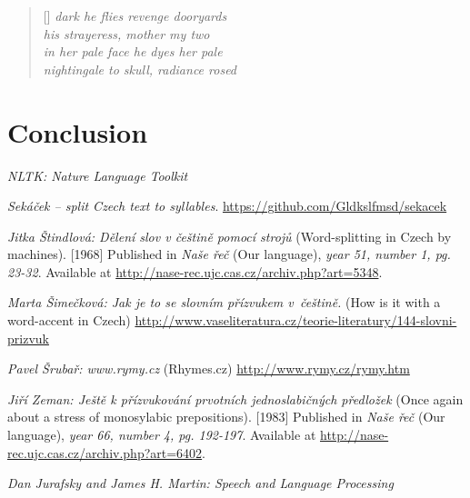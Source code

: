 \documentclass[a4]{article}
\begin{document}
\settowidth{\versewidth}{Than Tycho Brahe, or Erra Pater:}
\begin{verse}[\versewidth]
\it
dark he flies revenge dooryards \\
his strayeress, mother my two\\
in her pale face he dyes her pale\\
nightingale to skull, radiance rosed\\
\end{verse}



\section{Conclusion}


\begin{thebibliography}{99}

 {\sl NLTK: Nature Language Toolkit}

 {\sl Sekáček -- split Czech text to syllables}.
 \url{https://github.com/Gldkslfmsd/sekacek}


 {\sl Jitka Štindlová: Dělení slov v češtině pomocí strojů}
(Word-splitting in Czech by machines). [1968] Published in {\sl Naše řeč}
(Our language),
{\sl year 51, number 1, pg. 23-32}. Available at
\url{http://nase-rec.ujc.cas.cz/archiv.php?art=5348}.


 {\sl Marta Šimečková: Jak je to se slovním přízvukem v~češtině.} (How is
 it with a word-accent in Czech)
 \url{http://www.vaseliteratura.cz/teorie-literatury/144-slovni-prizvuk}


 {\sl Pavel Šrubař: www.rymy.cz} (Rhymes.cz)
 \url{http://www.rymy.cz/rymy.htm}




 {\sl Jiří Zeman: Ještě k přízvukování prvotních jednoslabičných
 předložek}
(Once again about a stress of monosylabic prepositions). [1983] Published in {\sl Naše řeč}
(Our language),
{\sl year 66, number 4, pg. 192-197}. Available at
\url{http://nase-rec.ujc.cas.cz/archiv.php?art=6402}.



 {\sl  Dan Jurafsky and James H. Martin:	
 Speech and Language Processing
 }




\end{thebibliography}



\end{document}
